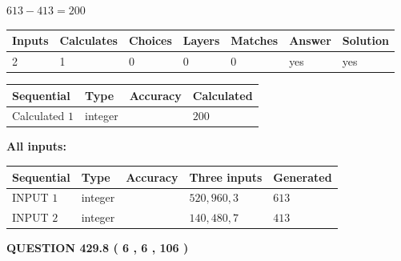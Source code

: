 \documentclass{ctexart}
\begin{document}
 

$ %
613 -  %
413=   %
200$
 
 
\noindent{}
 
 

 
   
   
   
   
\noindent\begin{tabular}{|l|l|l|l|l|l|l|}
 \hline
Inputs & Calculates & Choices & Layers & Matches & Answer & Solution \\ \hline
 2  & 
 1  & 
 0
  & 
 0  & 
 0  & 
  yes & 
  yes 
  \\ \hline
 \end{tabular}
   
   
   
   
\noindent{}
   
   
  
  
\noindent\begin{tabular}{|l|l|l|l|}
\hline
 Sequential & Type & Accuracy & Calculated \\ 
\hline
 
 
  Calculated $  1 $ & integer &  & 
  $ 200 $ 
 \\  \hline  
 \end{tabular}
   
   
   
   
\noindent\vspace{0.1in}\hspace{-0.08in} {\textbf{\Large{All inputs: }}}
   
   
  
  
\noindent\begin{tabular}{|l|l|l|l|l|}
\hline
 Sequential & Type & Accuracy & Three inputs & Generated \\ 
\hline
 
 
  INPUT $  1 $ & integer &  & $
 520
 , 
 960
 , 
 3
 $ & $ 613 $ 
 \\  \hline  
 
 
  INPUT $  2 $ & integer &  & $
 140
 , 
 480
 , 
 7
 $ & $ 413 $ 
 \\  \hline  
 \end{tabular}
   
   
  
\vspace{0.2in}
  
{\textbf{\Large{QUESTION
429.8 
 ( 6 , 6 , 106 )
}}}
  
\end{document}
